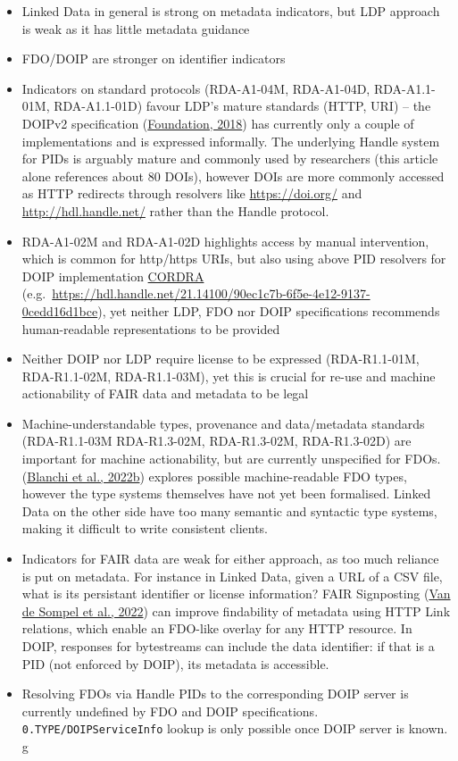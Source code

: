 \begin{itemize}
\tightlist
\item
  Linked Data in general is strong on metadata indicators, but LDP approach is weak as it has little metadata guidance
\item
  FDO/DOIP are stronger on identifier indicators
\item
  Indicators on standard protocols (RDA-A1-04M, RDA-A1-04D, RDA-A1.1-01M, RDA-A1.1-01D) favour LDP's mature standards (HTTP, URI) -- the DOIPv2 specification (\protect\hyperlink{ref-13TcbsZF6}{Foundation, 2018}) has currently only a couple of implementations and is expressed informally. The underlying Handle system for PIDs is arguably mature and commonly used by researchers (this article alone references about 80 DOIs), however DOIs are more commonly accessed as HTTP redirects through resolvers like \url{https://doi.org/} and \url{http://hdl.handle.net/} rather than the Handle protocol.
\item
  RDA-A1-02M and RDA-A1-02D highlights access by manual intervention, which is common for http/https URIs, but also using above PID resolvers for DOIP implementation \href{https://www.cordra.org/}{CORDRA} (e.g.~\url{https://hdl.handle.net/21.14100/90ec1c7b-6f5e-4e12-9137-0cedd16d1bce}), yet neither LDP, FDO nor DOIP specifications recommends human-readable representations to be provided
\item
  Neither DOIP nor LDP require license to be expressed (RDA-R1.1-01M, RDA-R1.1-02M, RDA-R1.1-03M), yet this is crucial for re-use and machine actionability of FAIR data and metadata to be legal
\item
  Machine-understandable types, provenance and data/metadata standards (RDA-R1.1-03M RDA-R1.3-02M, RDA-R1.3-02M, RDA-R1.3-02D) are important for machine actionability, but are currently unspecified for FDOs. (\protect\hyperlink{ref-126uxr5pI}{Blanchi et al., 2022b}) explores possible machine-readable FDO types, however the type systems themselves have not yet been formalised. Linked Data on the other side have too many semantic and syntactic type systems, making it difficult to write consistent clients.
\item
  Indicators for FAIR data are weak for either approach, as too much reliance is put on metadata. For instance in Linked Data, given a URL of a CSV file, what is its persistant identifier or license information? FAIR Signposting (\protect\hyperlink{ref-snykkm7R}{Van de Sompel et al., 2022}) can improve findability of metadata using HTTP Link relations, which enable an FDO-like overlay for any HTTP resource. In DOIP, responses for bytestreams can include the data identifier: if that is a PID (not enforced by DOIP), its metadata is accessible.
\item
  Resolving FDOs via Handle PIDs to the corresponding DOIP server is currently undefined by FDO and DOIP specifications. \texttt{0.TYPE/DOIPServiceInfo} lookup is only possible once DOIP server is known. g
\end{itemize}

